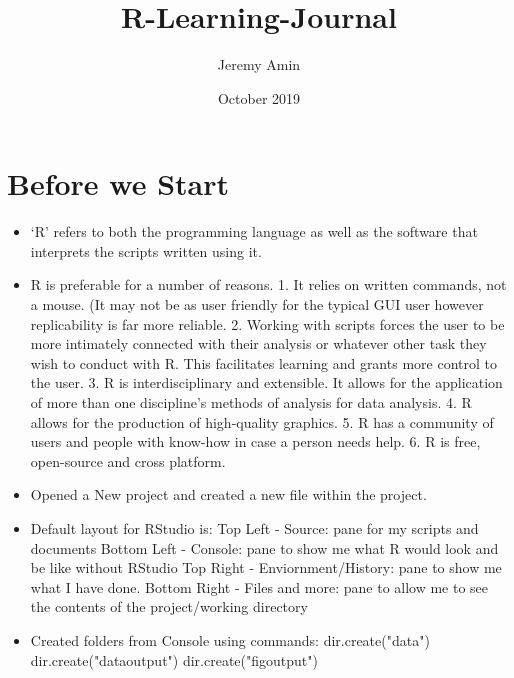 \documentclass{article}
\title{R-Learning-Journal}
\author{Jeremy Amin}
\date{October 2019}
\begin{document}
\maketitle

\section{Before we Start}

\begin{itemize}
    \item `R' refers to both the programming language as well as the software that interprets the scripts written using it.
    \item R is preferable for a number of reasons. 1. It relies on written commands, not a mouse. (It may not be as user friendly for the typical GUI user however replicability is far more reliable. 2. Working with scripts forces the user to be more intimately connected with their analysis or whatever other task they wish to conduct with R. This facilitates learning and grants more control to the user. 3. R is interdisciplinary and extensible. It allows for the application of more than one discipline's methods of analysis for data analysis. 4. R allows for the production of high-quality graphics. 5. R has a community of users and people with know-how in case a person needs help. 6. R is free, open-source and cross platform.
    \item Opened a New project and created a new file within the project.
    \item Default layout for RStudio is: Top Left - Source: pane for my scripts and documents
Bottom Left - Console: pane to show me what R would look and be like without RStudio
Top Right - Enviornment/History: pane to show me what I have done.
Bottom Right - Files and more: pane to allow me to see the contents of the project/working directory
\item Created folders from Console using commands: dir.create("data")
dir.create("data\textunderscore output")
dir.create("fig\textunderscore output")


    
\end{itemize}
\end{document}
